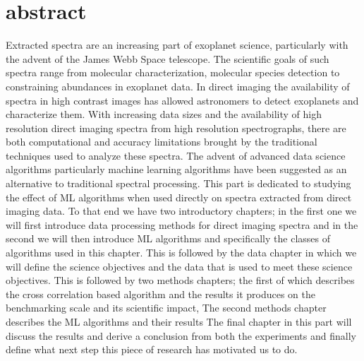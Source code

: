 \chapter*{abstract}
Extracted spectra are an increasing part of exoplanet science, particularly with the advent of the James Webb Space telescope. 
The scientific goals of such spectra range from molecular characterization, molecular species detection to constraining abundances in exoplanet data.
In direct imaging the availability of spectra in high contrast images has allowed astronomers to detect exoplanets and characterize them.
With increasing data sizes and the availability of high resolution direct imaging spectra from high resolution spectrographs, there are both computational and accuracy limitations brought by the traditional techniques used to analyze these spectra.
The advent of advanced data science algorithms particularly machine learning algorithms have been suggested as an alternative to traditional spectral processing.
This part is dedicated to studying the effect of ML algorithms when used directly on spectra extracted from direct imaging data.
To that end we have two introductory chapters;
in the first one  we will first introduce data processing methods for direct imaging spectra and in the second we will then introduce ML algorithms and specifically the classes of algorithms used in this chapter.
This is followed by the data chapter in which we will define the science objectives and the data that is used to meet these science objectives.
This is followed by two methods chapters; 
the first of which describes the cross correlation based algorithm and the results it produces on the benchmarking scale and its scientific impact,
The second methods chapter describes the ML algorithms and their results
The final chapter in this part will discuss the results and derive a conclusion from both the experiments and finally define what next step this piece of research has motivated us to do.
